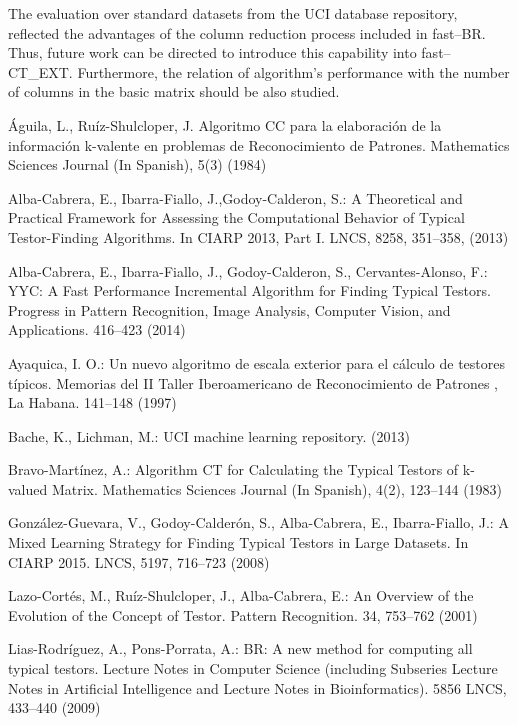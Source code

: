 \documentclass[citeauthoryear]{llncs}
\begin{document}
 The evaluation over standard datasets from the UCI database repository, reflected the advantages of the column reduction process included in fast--BR. Thus, future work can be directed to introduce this capability into fast--CT\_EXT. Furthermore, the relation of algorithm's performance with the number of columns in the basic matrix should be also studied.

%
\begin{thebibliography}{}
%


	Águila, L., Ruíz-Shulcloper, J.  
	Algoritmo CC para la elaboración de la información k-valente en problemas de Reconocimiento de Patrones. 
	Mathematics Sciences Journal (In Spanish), 
	5(3) (1984)
	
	Alba-Cabrera, E., Ibarra-Fiallo, J.,Godoy-Calderon, S.:
	A Theoretical and Practical Framework for Assessing the Computational Behavior of Typical Testor-Finding Algorithms.
	In CIARP 2013, Part I. LNCS,
	8258, 351--358, (2013)
	
	Alba-Cabrera, E., Ibarra-Fiallo, J., Godoy-Calderon, S., Cervantes-Alonso, F.:
	YYC: A Fast Performance Incremental Algorithm for Finding Typical Testors.
	Progress in Pattern Recognition, Image Analysis, Computer Vision, and Applications.
	416--423 (2014)
	
	Ayaquica, I. O.:
	Un nuevo algoritmo de escala exterior para el c\'alculo de testores t\'ipicos.
	Memorias del II Taller Iberoamericano de Reconocimiento de Patrones , La
	Habana. 141--148 (1997)
	
	Bache, K., Lichman, M.:
	UCI machine learning repository.
	(2013)
	
	Bravo-Martínez, A.:
	Algorithm CT for Calculating the Typical Testors of k-valued Matrix. 
	Mathematics Sciences Journal (In Spanish), 
	4(2), 123--144 (1983)
	
	González-Guevara, V., Godoy-Calderón, S., Alba-Cabrera, E.,  Ibarra-Fiallo, J.:
	A Mixed Learning Strategy for Finding Typical Testors in Large Datasets. 
	In CIARP 2015. LNCS,
	5197, 716--723 (2008)
		
	Lazo-Cort\'es, M., Ruíz-Shulcloper, J., Alba-Cabrera, E.:
	An Overview of the Evolution of the Concept of Testor. 
	Pattern Recognition. 34, 753--762 (2001)

	Lias-Rodr\'iguez, A., Pons-Porrata, A.:
	BR: A new method for computing all typical testors. 
	Lecture Notes in Computer Science (including Subseries Lecture Notes 
	in Artificial Intelligence and Lecture Notes in Bioinformatics).
	5856 LNCS, 433--440 (2009)


\end{thebibliography}
\end{document}
